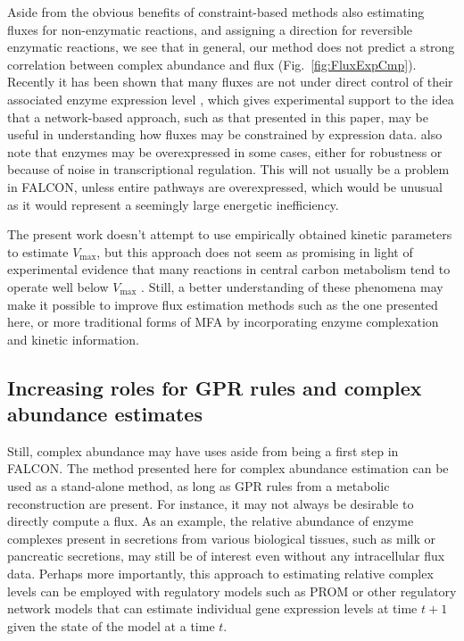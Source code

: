 Aside from the obvious benefits
of constraint-based methods also estimating fluxes for non-enzymatic
reactions, and assigning a direction for reversible enzymatic
reactions, we see that in general, our method does not predict a
strong correlation between complex abundance and flux
(\suppOrApp Fig.~\ref{fig:FluxExpCmp}). 
Recently it has been shown that many fluxes are not
under direct control of their associated enzyme expression
level \citep{Chubukov2013}, which gives experimental support to the
idea that a network-based approach, such as that
presented in this paper, may be useful in understanding how fluxes may
be constrained by expression data. \citealt{Chubukov2013} also note that enzymes
may be overexpressed in some cases, either for robustness or because
of noise in transcriptional regulation. This will not usually be a
problem in FALCON, unless entire pathways are overexpressed, which
would be unusual as it would represent a seemingly large energetic
inefficiency.

The present work doesn't attempt to use empirically
obtained kinetic parameters to estimate $V_{\max}$, but this approach
does not seem as promising in light of experimental evidence that many
reactions in central carbon metabolism tend to operate well below
$V_{\max}$ \citep{Bennett2009}. Still, a better understanding of these
phenomena may make it possible to improve flux estimation methods such
as the one presented here, or more traditional forms of MFA
\citep{Shestov2013a} by incorporating enzyme complexation and kinetic
information.


\subsection{Increasing roles for GPR rules and complex abundance estimates}
Still, complex abundance may have uses aside from being a first
step in FALCON. The method presented here for complex abundance
estimation can be used as a stand-alone method, as long as GPR
rules from a metabolic reconstruction are present. For instance, it
may not always be desirable to directly compute a flux. As an example,
the relative abundance of enzyme complexes present in secretions
from various biological tissues, such as milk or pancreatic
secretions, may still be of interest even without any intracellular
flux data. Perhaps more importantly, this approach to estimating
relative complex levels can be employed with regulatory models such as
PROM \citep{Chandrasekaran2010a} or other regulatory network models
that can estimate individual gene expression levels at time $t+1$
given the state of the model at a time $t$.

